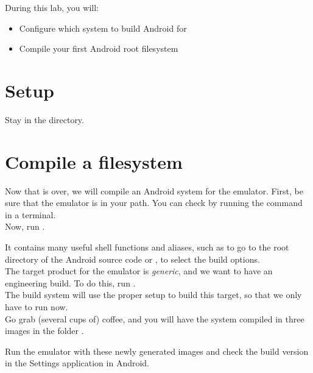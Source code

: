 
During this lab, you will:
\begin{itemize}
  \item Configure which system to build Android for
  \item Compile your first Android root filesystem
\end{itemize}

\section{Setup}

Stay in the  directory.

\section{Compile a filesystem}

Now that  is over, we will compile an Android system for the
emulator. First, be sure that the emulator is in your path. You can check
by running the  command in a terminal.\\

Now, run .

It contains many useful shell functions and aliases, such as  to
go to the root directory of the Android source code or , to select
the build options.\\

The target product for the emulator is {\it generic}, and we want to have an 
engineering build. To do this, run .\\

The build system will use the proper setup to build this target, so that we
only have  to run now.\\

Go grab (several cups of) coffee, and you will have the system compiled in three
images in the folder .

Run the emulator with these newly generated images and check the build version
in the Settings application in Android.
